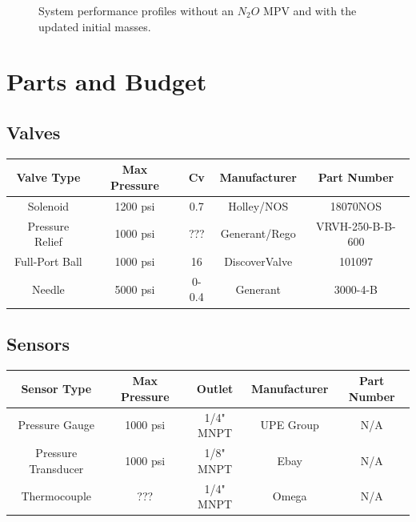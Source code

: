 \documentclass[9pt]{article} %
\numberwithin{equation}{section} %
\begin{document}
\begin{figure}[H]
\begin{minipage}{0.49\textwidth}
        \caption{System performance profiles without an $N_{2}O$ MPV and with the updated initial masses.}
        \label{fig:stanford_final_performace}
    \end{minipage}
\end{figure} 

\section{Parts and Budget}

\subsection{Valves}
\begin{center}
 \begin{tabular}{|c c c c c|} 
 \hline
 Valve Type & Max Pressure & Cv & Manufacturer & Part Number\\
 \hline\hline
 Solenoid & 1200 psi & 0.7 & Holley/NOS & 18070NOS\\ 
 \hline
 Pressure Relief & 1000 psi & ??? & Generant/Rego & VRVH-250-B-B-600\\
 \hline
 Full-Port Ball & 1000 psi & 16 & DiscoverValve & 101097	\\
 \hline
 Needle & 5000 psi & 0-0.4 & Generant & 3000-4-B\\ 
 \hline
\end{tabular}
\end{center}

\subsection{Sensors}
\begin{center}
 \begin{tabular}{|c c c c c|} 
 \hline
 Sensor Type & Max Pressure & Outlet & Manufacturer & Part Number\\
 \hline\hline
 Pressure Gauge & 1000 psi & 1/4" MNPT & UPE Group & N/A\\ 
 \hline
 Pressure Transducer & 1000 psi & 1/8" MNPT & Ebay & N/A\\
 \hline
 Thermocouple & ??? & 1/4" MNPT & Omega & N/A\\ 
 \hline
\end{tabular}
\end{center}
\end{document}
